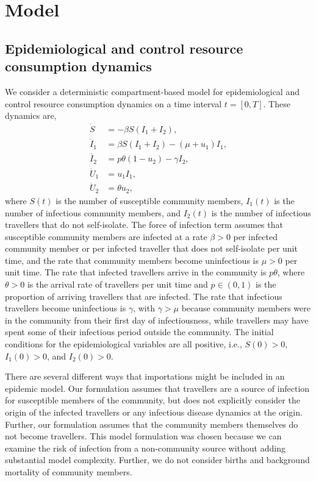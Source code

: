 \documentclass[pdflatex]{sn-jnl}
\theoremstyle{thmstyleone}%
\theoremstyle{thmstyletwo}%
\theoremstyle{thmstylethree}%
\begin{document}
\section{Model}\label{sec:model}
%
\subsection{Epidemiological and control resource consumption dynamics}\label{sec:epi}
We consider a deterministic compartment-based model for epidemiological and control resource consumption dynamics on a time interval $t = [0,T]$. These dynamics are, 
%
\begin{align}
    \dot{S} &=-\beta S(I_1 + I_2) \label{mm1}, \\
    \dot{I}_1 &=\beta S(I_1 + I_2) -(\mu + u_1) I_1 \label{mm2},\\
    \dot{I_2} &= p\theta (1-u_2) -\gamma I_2 \label{mm},\\
    \dot{U}_{1} &= u_1I_1, \\
    \dot{U}_{2} &= \theta  u_2, \label{eq:U2-}
\end{align}
%
 where $S(t)$ is the number of susceptible community members, $I_1(t)$ is the number of infectious community members, and $I_2(t)$ is the number of infectious travellers that do not self-isolate. The force of infection term assumes that susceptible community members are infected at a rate $\beta>0$ per infected community member or per infected traveller that does not self-isolate per unit time, and the rate that community members become uninfectious is $\mu>0$ per unit time. The rate that infected travellers arrive in the community is $p\theta$, where $\theta > 0$ is the arrival rate of travellers per unit time and $p \in (0,1)$ is the proportion of arriving travellers that are infected. The rate that infectious travellers become uninfectious is $\gamma$, with $\gamma > \mu$ because community members were in the community from their first day of infectiousness, while travellers may have spent some of their infectious period outside the community. The initial conditions for the epidemiological variables are all positive, i.e., $S(0)>0$, $I_1(0)>0$, and $I_2(0)>0$.

There are several different ways that importations might be included in an epidemic model. Our formulation assumes that travellers are a source of infection for susceptible members of the community, but does not explicitly consider the origin of the infected travellers or any infectious disease dynamics at the origin. Further, our formulation assumes that the community members themselves do not become travellers. This model formulation was chosen because we can examine the risk of infection from a non-community source without adding substantial model complexity. Further, we do not consider births and background mortality of community members. 
\end{document}
